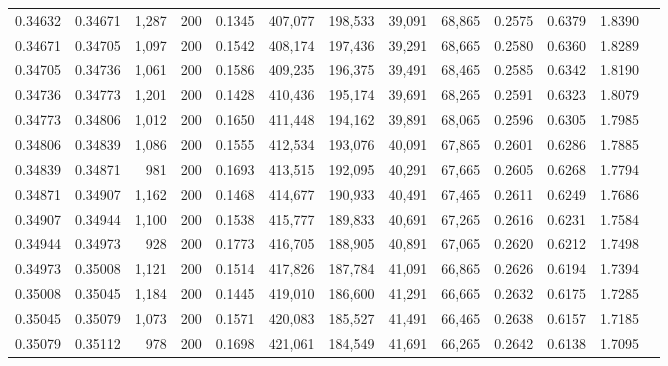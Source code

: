 \begin{tabular}{rrrrrrrrrrrrr}
0.34632 & 0.34671 & 1,287 & 200 &                                     0.1345 & 407,077 & 198,533 &  39,091 &  68,865 & 0.2575 & 0.6379 & 1.8390 \\
0.34671 & 0.34705 & 1,097 & 200 &                                     0.1542 & 408,174 & 197,436 &  39,291 &  68,665 & 0.2580 & 0.6360 & 1.8289 \\
0.34705 & 0.34736 & 1,061 & 200 &                                     0.1586 & 409,235 & 196,375 &  39,491 &  68,465 & 0.2585 & 0.6342 & 1.8190 \\
0.34736 & 0.34773 & 1,201 & 200 &                                     0.1428 & 410,436 & 195,174 &  39,691 &  68,265 & 0.2591 & 0.6323 & 1.8079 \\
0.34773 & 0.34806 & 1,012 & 200 &                                     0.1650 & 411,448 & 194,162 &  39,891 &  68,065 & 0.2596 & 0.6305 & 1.7985 \\
0.34806 & 0.34839 & 1,086 & 200 &                                     0.1555 & 412,534 & 193,076 &  40,091 &  67,865 & 0.2601 & 0.6286 & 1.7885 \\
0.34839 & 0.34871 &   981 & 200 &                                     0.1693 & 413,515 & 192,095 &  40,291 &  67,665 & 0.2605 & 0.6268 & 1.7794 \\
0.34871 & 0.34907 & 1,162 & 200 &                                     0.1468 & 414,677 & 190,933 &  40,491 &  67,465 & 0.2611 & 0.6249 & 1.7686 \\
0.34907 & 0.34944 & 1,100 & 200 &                                     0.1538 & 415,777 & 189,833 &  40,691 &  67,265 & 0.2616 & 0.6231 & 1.7584 \\
0.34944 & 0.34973 &   928 & 200 &                                     0.1773 & 416,705 & 188,905 &  40,891 &  67,065 & 0.2620 & 0.6212 & 1.7498 \\
0.34973 & 0.35008 & 1,121 & 200 &                                     0.1514 & 417,826 & 187,784 &  41,091 &  66,865 & 0.2626 & 0.6194 & 1.7394 \\
0.35008 & 0.35045 & 1,184 & 200 &                                     0.1445 & 419,010 & 186,600 &  41,291 &  66,665 & 0.2632 & 0.6175 & 1.7285 \\
0.35045 & 0.35079 & 1,073 & 200 &                                     0.1571 & 420,083 & 185,527 &  41,491 &  66,465 & 0.2638 & 0.6157 & 1.7185 \\
0.35079 & 0.35112 &   978 & 200 &                                     0.1698 & 421,061 & 184,549 &  41,691 &  66,265 & 0.2642 & 0.6138 & 1.7095 \\

\end{tabular}
